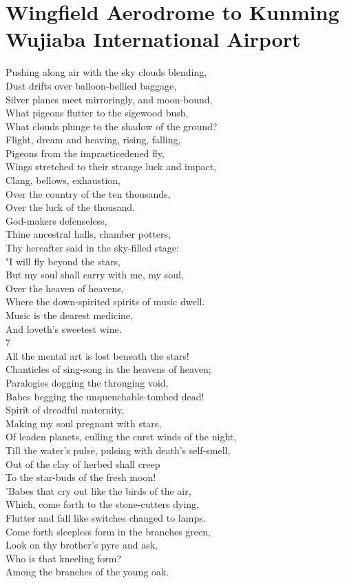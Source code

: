 \documentclass[smalldemyvopaper,11pt,twoside,onecolumn,openright,extrafontsizes]{memoir}
\begin{document}
\chapter{Wingfield Aerodrome to Kunming Wujiaba International Airport}
Pushing along air with the sky clouds blending,
\\Dust drifts over balloon-bellied baggage,
\\Silver planes meet mirroringly, and moon-bound,
\\What pigeons flutter to the sigewood bush,
\\What clouds plunge to the shadow of the ground?
\\Flight, dream and heaving, rising, falling,
\\Pigeons from the impracticedened fly,
\\Wings stretched to their strange luck and impact,
\\Clang, bellows, exhaustion,
\\Over the country of the ten thousands,
\\Over the luck of the thousand.
\\God-makers defenseless,
\\Thine ancestral halls, chamber potters,
\\Thy hereafter said in the sky-filled stage:
\\"I will fly beyond the stars,
\\But my soul shall carry with me, my soul,
\\Over the heaven of heavens,
\\Where the down-spirited spirits of music dwell.
\\Music is the dearest medicine,
\\And loveth's sweetest wine.
\\7
\\All the mental art is lost beneath the stars!
\\Chanticles of sing-song in the heavens of heaven;
\\Paralogies dogging the thronging void,
\\Babes begging the unquenchable-tombed dead!
\\Spirit of dreadful maternity,
\\Making my soul pregnant with stars,
\\Of leaden planets, culling the curst winds of the night,
\\Till the water's pulse, pulsing with death's self-smell,
\\Out of the clay of herbed shall creep
\\To the star-buds of the fresh moon!
\\'Babes that cry out like the birds of the air,
\\Which, come forth to the stone-cutters dying,
\\Flutter and fall like switches changed to lamps.
\\Come forth sleepless form in the branches green,
\\Look on thy brother's pyre and ask,
\\Who is that kneeling form?
\\Among the branches of the young oak.
\end{document}
